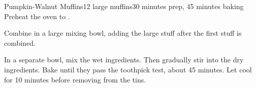 \documentclass[../Cookbook.tex]{subfiles}
\begin{document}
\begin{recipe}{Pumpkin-Walnut Muffins}{12 large muffins}{30 minutes prep, 45 minutes baking}
Preheat the oven to .

Combine in a large mixing bowl, adding the large stuff after the first stuff is combined.

In a separate bowl, mix the wet ingredients.
Then gradually stir into the dry ingredients. Bake until they pass the toothpick test, about 45 minutes. Let cool for 10 minutes before removing from the tins.


\end{recipe}
\end{document}
